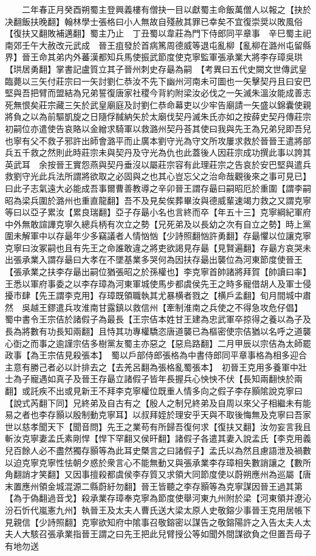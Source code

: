 　　二年春正月癸酉朔蜀主登興義樓有僧抉一目以獻蜀主命飯萬僧人以報之【抉於决翻飯扶晚翻】翰林學士張格曰小人無故自殘赦其罪已幸矣不宜復崇奨以敗風俗【復扶又翻敗補邁翻】蜀主乃止　丁丑蜀以韋莊為門下侍郎同平章事　辛巳蜀主祀南郊壬午大赦改元武成　晉王疽發於首病篤周德威等退屯亂柳【亂柳在潞州屯留縣界】晉王命其弟内外蕃漢都知兵馬使振武節度使克寧監軍張承業大將李存璋吳珙【珙居勇翻】掌書記盧質立其子晉州刺史存朂為嗣　【考異曰五代史闕文世傳武皇臨薨以三矢付莊宗曰一矢討劉仁恭汝不先下幽州河南未可圖也一矢擊契丹且曰安巴堅與吾把臂而盟結為兄弟誓復唐家社稷今背約附梁汝必伐之一矢滅朱溫汝能成善志死無恨矣莊宗藏三矢於武皇廟庭及討劉仁恭命幕吏以少牢告廟請一矢盛以錦囊使親將負之以為前驅凱旋之日隨俘馘納矢於太廟伐契丹滅朱氏亦如之按薛史契丹傳莊宗初嗣位亦遣使告哀賂以金繒求騎軍以救潞州契丹荅其使曰我與先王為兄弟兒即吾兒也寧有父不救子邪許出師會潞平而止廣本劉守光為守文所攻屢求救於晉晉王遣將部兵五千救之然則此時莊宗未與契丹及守光為仇也此蓋後人因莊宗成功撰此事以誇其英武耳　余按晉王實怨燕與契丹垂沒以屬莊宗容有此理莊宗之告哀於安巴堅與遣兵救劉守光此兵法所謂將欲取之必固與之也其心豈忘父之治命哉觀後來之事可見已】曰此子志氣遠大必能成吾事爾曹善教導之辛卯晉王謂存朂曰嗣昭厄於重圍【謂李嗣昭為梁兵圍於潞州也重直龍翻】吾不及見矣俟葬畢汝與德威輩速竭力救之又謂克寧等曰以亞子累汝【累良瑞翻】亞子存朂小名也言終而卒【年五十三】克寧綱紀軍府中外無敢諠譁克寧久總兵柄有次立之勢【兄死弟及以長幼之次有自立之勢】時上黨圍未解軍中以存朂年少多竊議者人情忷忷【少詩照翻忷許勇翻】存朂懼以位讓克寧克寧曰汝冢嗣也且有先王之命誰敢違之將吏欲謁見存朂【見賢遍翻】存朂方哀哭未出張承業入謂存朂曰大孝在不墜基業多哭何為因扶存朂出襲位為河東節度使晉王【張承業之扶李存朂出嗣位猶張昭之於孫權也】李克寧首帥諸將拜賀【帥讀曰率】王悉以軍府事委之以李存璋為河東軍城使馬步都虞侯先王之時多寵借胡人及軍士侵擾市肆【先王謂李克用】存璋既領職執其尤暴横者戮之【横戶孟翻】旬月間城中肅然　吳越王鏐遣兵攻淮南甘露鎮以救信州【牽制淮南之兵使之不得急攻危仔倡】　蜀中書令王宗佶於諸假子為最長【王宗佶本姓甘王建為忠武軍卒掠得之養以為子及長為將數有功長知兩翻】且恃其功專權驕恣唐道襲已為樞密使宗佶猶以名呼之道襲心衘之而事之逾謹宗佶多樹黨友蜀主亦惡之【惡烏路翻】二月甲辰以宗佶為太師罷政事【為王宗佶見殺張本】　蜀以戶部侍郎張格為中書侍郎同平章事格為相多迎合主意有勝己者必以計排去之【去羌呂翻為張格亂蜀張本】　初晉王克用多養軍中壯士為子寵遇如真子及晉王存朂立諸假子皆年長握兵心怏怏不伏【長知兩翻怏於兩翻】或託疾不出或見新王不拜李克寧權位既重人情多向之假子李存顥隂說克寧曰【說式芮翻下同】兄終弟及自古有之【殷人之制兄終弟及自周以來父子相繼未有能易之者也李存顥以殷制動克寧耳】以叔拜姪於理安乎天與不取後悔無及克寧曰吾家世以慈孝聞天下【聞音問】先王之業苟有所歸吾復何求【復扶又翻】汝勿妄言我且斬汝克寧妻孟氏素剛悍【悍下罕翻又侯旰翻】諸假子各遣其妻入說孟氏【李克用義兒百餘人必不盡然獨存顥等為此耳史槩言之曰諸假子】孟氏以為然且慮語泄及禍數以迫克寧克寧性怯朝夕惑於衆言心不能無動又與張承業李存璋相失數誚讓之【數所角翻誚才笑翻】又因事擅殺都虞侯李存質又求領大同節度使以蔚朔應州為巡屬【唐末置應州領金城混源二縣蔚紆勿翻】晉王皆聽之李存顥等為克寧謀因晉王過其第【為于偽翻過音戈】殺承業存璋奉克寧為節度使舉河東九州附於梁【河東領并遼沁汾石忻代嵐憲九州】執晉王及太夫人曹氏送大梁太原人史敬鎔少事晉王克用居帳下見親信【少詩照翻】克寧欲知府中隂事召敬鎔密以謀告之敬鎔陽許之入告太夫人太夫人大駭召張承業指晉王謂之曰先王把此兒臂授公等如聞外間謀欲負之但置吾母子有地勿送